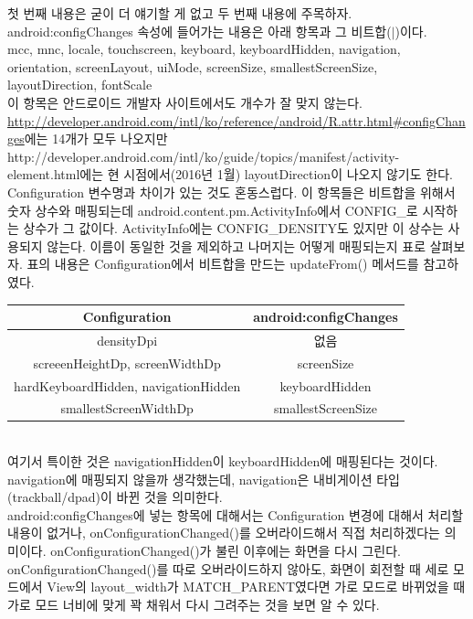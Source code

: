 첫 번째 내용은 굳이 더 얘기할 게 없고 두 번째 내용에 주목하자.
android:configChanges 속성에 들어가는 내용은 아래 항목과 그 비트합($|$)이다.\\
mcc, mnc, locale,
touchscreen, keyboard, keyboardHidden, 
navigation, orientation, screenLayout, uiMode, screenSize,
smallestScreenSize, layoutDirection, fontScale\\

이 항목은 안드로이드 개발자 사이트에서도 개수가 잘 맞지 않는다. \url{http://developer.android.com/intl/ko/reference/android/R.attr.html\#configChanges}에는 14개가 모두 나오지만 http://developer.android.com/intl/ko/guide/topics/manifest/activity-element.html에는 현 시점에서(2016년 1월) layoutDirection이 나오지 않기도 한다.\\

Configuration 변수명과 차이가 있는 것도 혼동스럽다. 이 항목들은 비트합을 위해서 숫자 상수와 매핑되는데 android.content.pm.ActivityInfo에서 CONFIG\_로 시작하는 상수가 그 값이다.
ActivityInfo에는 CONFIG\_DENSITY도 있지만 이 상수는 사용되지 않는다.
이름이 동일한 것을 제외하고 나머지는 어떻게 매핑되는지 표로 살펴보자. 표의 내용은 Configuration에서 비트합을 만드는 updateFrom() 메서드를 참고하였다.\\

\begin{tabular}{|c|c|}\hline
Configuration & android:configChanges \\ \hline
densityDpi & 없음 \\ \hline
screeenHeightDp, screenWidthDp & screenSize \\ \hline
hardKeyboardHidden, navigationHidden  & keyboardHidden  \\ \hline
smallestScreenWidthDp & smallestScreenSize \\ \hline
\end{tabular}\\

여기서 특이한 것은 navigationHidden이 keyboardHidden에 매핑된다는 것이다. navigation에 매핑되지 않을까 생각했는데, navigation은 내비게이션 타입(trackball/dpad)이 바뀐 것을 의미한다.\\

android:configChanges에 넣는 항목에 대해서는 Configuration 변경에 대해서 처리할 내용이 없거나, onConfigurationChanged()를 오버라이드해서 직접 처리하겠다는 의미이다. onConfigurationChanged()가 불린 이후에는 화면을 다시 그린다. onConfigurationChanged()를 따로 오버라이드하지 않아도, 화면이 회전할 때 세로 모드에서 View의 layout\_width가 MATCH\_PARENT였다면 가로 모드로 바뀌었을 때 가로 모드 너비에 맞게 꽉 채워서 다시 그려주는 것을 보면 알 수 있다.\\

